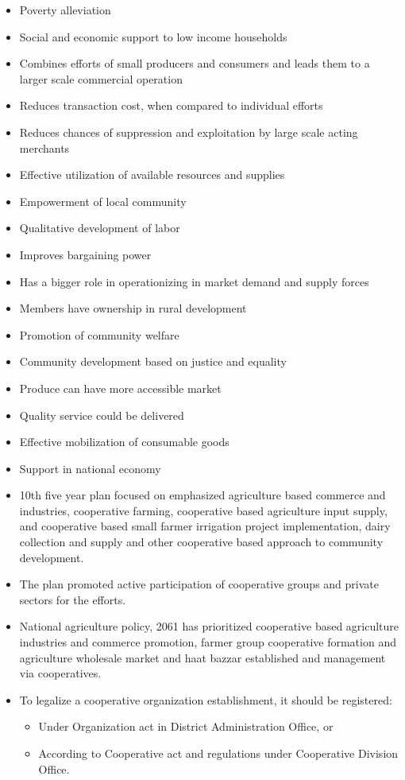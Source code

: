 \documentclass[
  openany]{book}
\providecommand{\tightlist}{%
  \setlength{\itemsep}{0pt}\setlength{\parskip}{0pt}}
\begin{document}
\begin{itemize}
\item
  Poverty alleviation
\item
  Social and economic support to low income households
\item
  Combines efforts of small producers and consumers and leads them to a larger scale commercial operation
\item
  Reduces transaction cost, when compared to individual efforts
\item
  Reduces chances of suppression and exploitation by large scale acting merchants
\item
  Effective utilization of available resources and supplies
\item
  Empowerment of local community
\item
  Qualitative development of labor
\item
  Improves bargaining power
\item
  Has a bigger role in operationizing in market demand and supply forces
\item
  Members have ownership in rural development
\item
  Promotion of community welfare
\item
  Community development based on justice and equality
\item
  Produce can have more accessible market
\item
  Quality service could be delivered
\item
  Effective mobilization of consumable goods
\item
  Support in national economy
\item
  10th five year plan focused on emphasized agriculture based commerce and industries, cooperative farming, cooperative based agriculture input supply, and cooperative based small farmer irrigation project implementation, dairy collection and supply and other cooperative based approach to community development.
\item
  The plan promoted active participation of cooperative groups and private sectors for the efforts.
\item
  National agriculture policy, 2061 has prioritized cooperative based agriculture industries and commerce promotion, farmer group cooperative formation and agriculture wholesale market and haat bazzar established and management via cooperatives.
\item
  To legalize a cooperative organization establishment, it should be registered:

  \begin{itemize}
  \tightlist
  \item
    Under Organization act in District Administration Office, or
  \item
    According to Cooperative act and regulations under Cooperative Division Office.
  \end{itemize}
\end{itemize}
\end{document}
